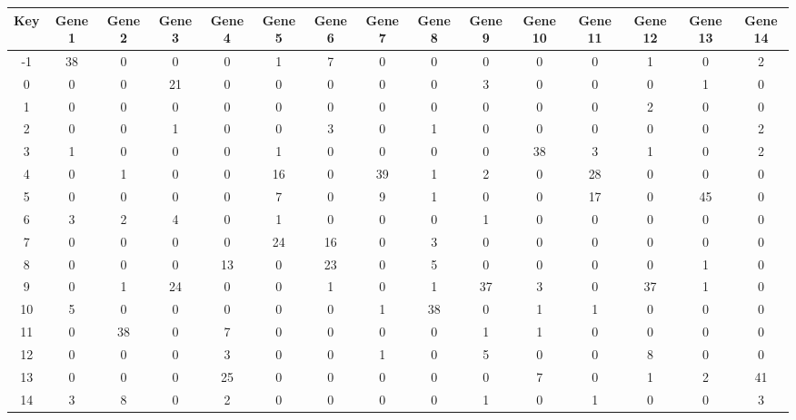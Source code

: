 \begin{tabular}{|c|c|c|c|c|c|c|c|c|c|c|c|c|c|c|}
\hline
Key & Gene 1 & Gene 2 & Gene 3 & Gene 4 & Gene 5 & Gene 6 & Gene 7 & Gene 8 & Gene 9 & Gene 10 & Gene 11 & Gene 12 & Gene 13 & Gene 14 \\
\hline
-1 & 38 & 0 & 0 & 0 & 1 & 7 & 0 & 0 & 0 & 0 & 0 & 1 & 0 & 2 \\
0 & 0 & 0 & 21 & 0 & 0 & 0 & 0 & 0 & 3 & 0 & 0 & 0 & 1 & 0 \\
1 & 0 & 0 & 0 & 0 & 0 & 0 & 0 & 0 & 0 & 0 & 0 & 2 & 0 & 0 \\
2 & 0 & 0 & 1 & 0 & 0 & 3 & 0 & 1 & 0 & 0 & 0 & 0 & 0 & 2 \\
3 & 1 & 0 & 0 & 0 & 1 & 0 & 0 & 0 & 0 & 38 & 3 & 1 & 0 & 2 \\
4 & 0 & 1 & 0 & 0 & 16 & 0 & 39 & 1 & 2 & 0 & 28 & 0 & 0 & 0 \\
5 & 0 & 0 & 0 & 0 & 7 & 0 & 9 & 1 & 0 & 0 & 17 & 0 & 45 & 0 \\
6 & 3 & 2 & 4 & 0 & 1 & 0 & 0 & 0 & 1 & 0 & 0 & 0 & 0 & 0 \\
7 & 0 & 0 & 0 & 0 & 24 & 16 & 0 & 3 & 0 & 0 & 0 & 0 & 0 & 0 \\
8 & 0 & 0 & 0 & 13 & 0 & 23 & 0 & 5 & 0 & 0 & 0 & 0 & 1 & 0 \\
9 & 0 & 1 & 24 & 0 & 0 & 1 & 0 & 1 & 37 & 3 & 0 & 37 & 1 & 0 \\
10 & 5 & 0 & 0 & 0 & 0 & 0 & 1 & 38 & 0 & 1 & 1 & 0 & 0 & 0 \\
11 & 0 & 38 & 0 & 7 & 0 & 0 & 0 & 0 & 1 & 1 & 0 & 0 & 0 & 0 \\
12 & 0 & 0 & 0 & 3 & 0 & 0 & 1 & 0 & 5 & 0 & 0 & 8 & 0 & 0 \\
13 & 0 & 0 & 0 & 25 & 0 & 0 & 0 & 0 & 0 & 7 & 0 & 1 & 2 & 41 \\
14 & 3 & 8 & 0 & 2 & 0 & 0 & 0 & 0 & 1 & 0 & 1 & 0 & 0 & 3 \\
\hline
\end{tabular}